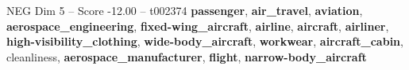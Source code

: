 \begin{textsample}{NEG Dim 5 – Score -12.00 – t002374}  \label{ex:f5_neg_031}
\textbf{passenger}, \textbf{air\_travel}, \textbf{aviation}, \textbf{aerospace\_engineering}, \textbf{fixed-wing\_aircraft}, \textbf{airline}, \textbf{aircraft}, \textbf{airliner}, \textbf{high-visibility\_clothing}, \textbf{wide-body\_aircraft}, \textbf{workwear}, \textbf{aircraft\_cabin}, cleanliness, \textbf{aerospace\_manufacturer}, \textbf{flight}, \textbf{narrow-body\_aircraft}

\end{textsample}
